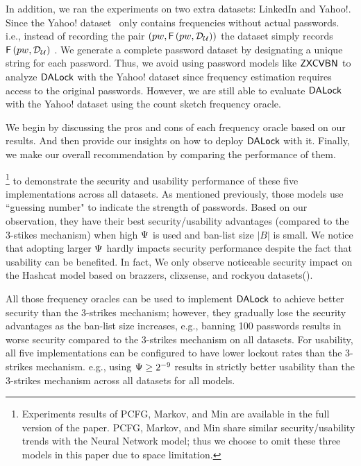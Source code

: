 In addition, we ran the experiments on two extra datasets: LinkedIn and Yahoo!. Since the Yahoo! dataset~\cite{SP:Bonneau12,NDSS:BloDatBon16} only contains frequencies without actual passwords. i.e., instead of recording the pair $(pw,  \mathsf{F}\left(pw, \mathcal{D}_{{\mathcal{U}}} \right))$ the dataset simply records $\mathsf{F}\left(pw, \mathcal{D}_{{\mathcal{U}}} \right)$ . We generate a complete password dataset by designating a unique string for each password. Thus, we avoid using password models like $\mathsf{ZXCVBN}$ to analyze $\mathsf{DALock}$ with the Yahoo! dataset since frequency estimation requires access to the original passwords. However, we are still able to evaluate $\mathsf{DALock}$ with the Yahoo! dataset using the count sketch frequency oracle. 

We begin by discussing the pros and cons of each frequency oracle based on our results. And then provide our insights on how to deploy $\mathsf{DALock}$ with it. Finally, we make our overall recommendation by comparing the performance of them.

\footnote{Experiments results of PCFG, Markov, and Min are available in the full version of the paper. PCFG, Markov, and Min share similar security/usability trends with the Neural Network model; thus we choose to omit these three models in this paper due to space limitation.  }   to  demonstrate the security and usability performance of these five implementations across all datasets. As mentioned previously, those models use ``guessing number" to indicate the strength of passwords. Based on our observation, they have their best security/usability advantages (compared to the 3-stikes mechanism) when high $\Psi$ is used and ban-list size $|B|$ is small. We notice that adopting larger $\Psi$ hardly impacts security performance despite the fact that usability can be benefited. In fact, We only observe noticeable security impact on the Hashcat model based on brazzers, clixsense, and rockyou datasets().

All those frequency oracles can be used to implement $\mathsf{DALock}$ to achieve better security than the 3-strikes mechanism; however, they gradually lose the security advantages as the ban-list size increases, e.g., banning 100 passwords results in worse security compared to the 3-strikes mechanism on all datasets. For usability, all five implementations can be configured to have lower lockout rates than the 3-strikes mechanism. e.g., using $\Psi \ge 2^{-9}$ results in strictly better usability than the 3-strikes mechanism across all datasets for all models. 

